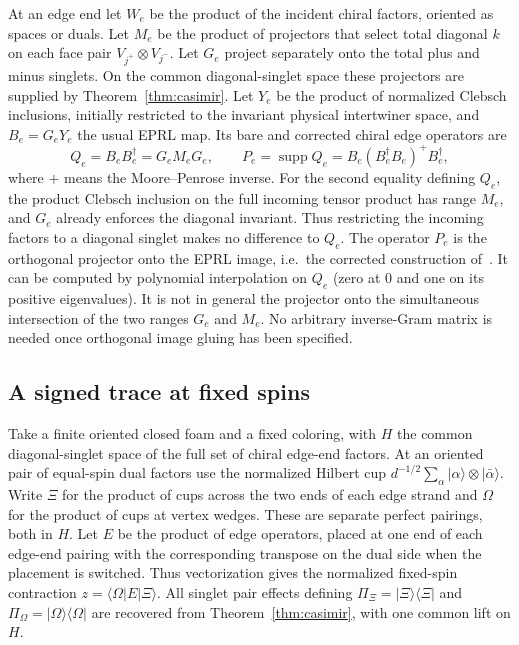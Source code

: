 \documentclass[11pt]{article}
\theoremstyle{remark}
\DeclareMathOperator{\supp}{supp}
\newcommand{\pket}[1]{\lvert #1\rangle}
\newcommand{\pbra}[1]{\langle #1\rvert}
\newcommand{\proj}[1]{\pket{#1}\pbra{#1}}
\begin{document}
At an edge end let \(W_e\) be the product of the incident chiral factors, oriented as spaces or duals. Let \(M_e\) be the product of projectors that select total diagonal \(k\) on each face pair \(V_{j^+}\otimes V_{j^-}\). Let \(G_e\) project separately onto the total plus and minus singlets. On the common diagonal-singlet space these projectors are supplied by Theorem~\ref{thm:casimir}. Let \(Y_e\) be the product of normalized Clebsch inclusions, initially restricted to the invariant physical intertwiner space, and \(B_e=G_eY_e\) the usual EPRL map. Its bare and corrected chiral edge operators are
\begin{equation}\label{eq:Q}
 Q_e=B_eB_e^\dagger=G_eM_eG_e,\qquad
 P_e=\supp Q_e=B_e(B_e^\dagger B_e)^+B_e^\dagger ,
\end{equation}
where \(+\) means the Moore--Penrose inverse. For the second equality defining \(Q_e\), the product Clebsch inclusion on the full incoming tensor product has range \(M_e\), and \(G_e\) already enforces the diagonal invariant. Thus restricting the incoming factors to a diagonal singlet makes no difference to \(Q_e\). The operator \(P_e\) is the orthogonal projector onto the EPRL image, i.e.\ the corrected construction of~\cite{KKL,Operator}. It can be computed by polynomial interpolation on \(Q_e\) (zero at \(0\) and one on its positive eigenvalues). It is not in general the projector onto the simultaneous intersection of the two ranges \(G_e\) and \(M_e\). No arbitrary inverse-Gram matrix is needed once orthogonal image gluing has been specified.

\subsection{A signed trace at fixed spins}

Take a finite oriented closed foam and a fixed coloring, with \(H\) the common diagonal-singlet space of the full set of chiral edge-end factors. At an oriented pair of equal-spin dual factors use the normalized Hilbert cup \(d^{-1/2}\sum_\alpha\pket{\alpha}\otimes\pket{\bar\alpha}\). Write \(\Xi\) for the product of cups across the two ends of each edge strand and \(\Omega\) for the product of cups at vertex wedges. These are separate perfect pairings, both in \(H\). Let \(E\) be the product of edge operators, placed at one end of each edge-end pairing with the corresponding transpose on the dual side when the placement is switched. Thus vectorization gives the normalized fixed-spin contraction \(z=\pbra{\Omega}E\pket{\Xi}\). All singlet pair effects defining \(\Pi_\Xi=\proj{\Xi}\) and \(\Pi_\Omega=\proj{\Omega}\) are recovered from Theorem~\ref{thm:casimir}, with one common lift on \(H\).
\end{document}

